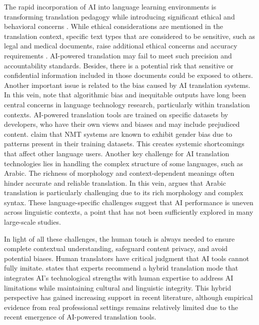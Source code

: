 \documentclass[english]{textolivre}
\begin{document}
The rapid incorporation of AI into language learning environments is transforming translation pedagogy while introducing significant ethical and behavioral concerns \cite{ZhangLi2026EthicalPerceptions}. While ethical considerations are mentioned in the translation context, specific text types that are considered to be sensitive, such as legal and medical documents, raise additional ethical concerns and accuracy requirements \cite{Shahmerdanova2025AITranslation,vanKolfschootenEtAl2025HealthcareAI}. AI-powered translation may fail to meet such precision and accountability standards. Besides, there is a potential risk that sensitive or confidential information included in those documents could be exposed to others. Another important issue is related to the bias caused by AI translation systems. In this vein, \textcite{ZhangLi2026EthicalPerceptions} note that algorithmic bias and inequitable outputs have long been central concerns in language technology research, particularly within translation contexts. AI-powered translation tools are trained on specific datasets by developers, who have their own views and biases and may include prejudiced content. \textcite{TomalinEtAl2021BiasReduction} claim that NMT systems are known to exhibit gender bias due to patterns present in their training datasets. This creates systemic shortcomings that affect other language users. Another key challenge for AI translation technologies lies in handling the complex structure of some languages, such as Arabic. The richness of morphology and context-dependent meanings often hinder accurate and reliable translation. In this vein, \textcite{Bousetouane2024ArabicTranslationAI} argues that Arabic translation is particularly challenging due to its rich morphology and complex syntax. These language-specific challenges suggest that AI performance is uneven across linguistic contexts, a point that has not been sufficiently explored in many large-scale studies.

In light of all these challenges, the human touch is always needed to ensure complete contextual understanding, safeguard content privacy, and avoid potential biases. Human translators have critical judgment that AI tools cannot fully imitate. \textcite{Shahmerdanova2025AITranslation} states that experts recommend a hybrid translation mode that integrates AI’s technological strengths with human expertise to address AI limitations while maintaining cultural and linguistic integrity. This hybrid perspective has gained increasing support in recent literature, although empirical evidence from real professional settings remains relatively limited due to the recent emergence of AI-powered translation tools.
\end{document}
